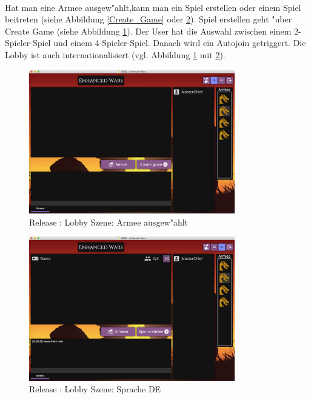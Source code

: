 \documentclass[12pt, titlepage]{scrartcl}
\newcommand{\RN}[1]{%
	\textup{\uppercase\expandafter{\romannumeral#1}}%
}
\begin{document}
			    \ \vspace{0.5cm} \\ Hat man eine Armee ausgew"ahlt,kann man ein Spiel erstellen oder einem Spiel beitreten (siehe Abbildung \ref{Create_Game} oder \ref{Lobby_Language}). Spiel erstellen geht "uber Create Game (siehe Abbildung \ref{Lobby_Army_Selected}). Der User hat die Auswahl zwischen einem 2-Spieler-Spiel und einem 4-Spieler-Spiel. Danach wird ein Autojoin getriggert. Die Lobby ist auch internationalisiert (vgl. Abbildung \ref{Lobby_Army_Selected} mit \ref{Lobby_Language}). \\
			    \begin{figure}[H] 
    				\centering
    				\includegraphics[width=0.8\textwidth]{images/old_state/lobby/ArmySelected.png}
    				\caption{Release \RN{2}: Lobby Szene: Armee ausgew"ahlt}
    				\label{Lobby_Army_Selected}
			    \end{figure}
			    \begin{figure}[H] 
    				\centering
    				\includegraphics[width=0.8\textwidth]{images/old_state/lobby/International+Chat+GameCreated.png}
    				\caption{Release \RN{2}: Lobby Szene: Sprache DE}
    				\label{Lobby_Language}
			    \end{figure}
\end{document}
